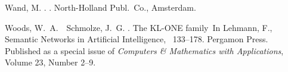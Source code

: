 \begin{thebibliography}{}
Wand, M. \BBCP.
.
\newblock North-Holland Publ.\ Co., Amsterdam.

Woods, W.~A.\BBACOMMA\  \BBA\ Schmolze, J.~G. \BBCP.
\newblock \BBOQ The {KL-ONE} family\BBCQ\
\newblock In Lehmann, F.\BED, {\Bem Semantic Networks in Artificial
  Intelligence}, \BPGS\ 133--178. Pergamon Press.
\newblock Published as a special issue of {\it Computers \& Mathematics with
  Applications}, Volume 23, Number 2--9.

\end{thebibliography}

